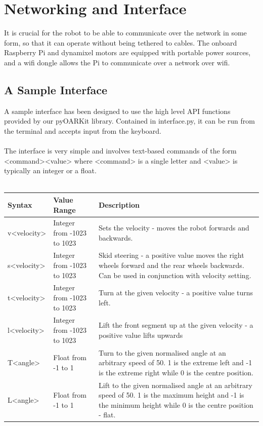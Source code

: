 \documentclass[]{article}
\begin{document}
\section{Networking and Interface}
It is crucial for the robot to be able to communicate over the network in some form, so that it can operate without being tethered to cables. The onboard Raspberry Pi and dynamixel motors are equipped with portable power sources, and a wifi dongle allows the Pi to communicate over a network over wifi.

\subsection{A Sample Interface}
A sample interface has been designed to use the high level API functions provided by our pyOARKit library. Contained in interface.py, it can be run from the terminal and accepts input from the keyboard.
\\
\\
The interface is very simple and involves text-based commands of the form <command><value> where <command> is a single letter and <value> is typically an integer or a float.
\\
\\
\begin{tabular}{ | l | l | p{5cm} | }
\hline
\textbf{Syntax} & \textbf{Value Range} & \textbf{Description} \\ \hline
v<velocity> & Integer from -1023 to 1023 & Sets the velocity - moves the robot forwards and backwards. \\ \hline
s<velocity> & Integer from -1023 to 1023 & Skid steering - a positive value moves the right wheels forward and the rear wheels backwards. Can be used in conjunction with velocity setting. \\ \hline
t<velocity> & Integer from -1023 to 1023 & Turn at the given velocity - a positive value turns left. \\ \hline
l<velocity> & Integer from -1023 to 1023 & Lift the front segment up at the given velocity - a positive value lifts upwards \\ \hline
T<angle> & Float from -1 to 1 & Turn to the given normalised angle at an arbitrary speed of 50. 1 is the extreme left and -1 is the extreme right while 0 is the centre position. \\ \hline
L<angle> & Float from -1 to 1 & Lift to the given normalised angle at an arbitrary speed of 50. 1 is the maximum height and -1 is the minimum height while 0 is the centre position - flat. \\ \hline
\end{tabular}
\end{document}
